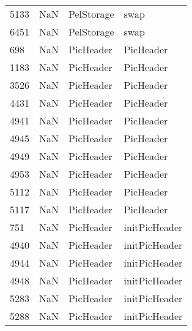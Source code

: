 \begin{tabular}{llll}
5133 &                   NaN &                 PelStorage &                                      swap \\
6451 &                   NaN &                 PelStorage &                                      swap \\
698  &                   NaN &                  PicHeader &                                 PicHeader \\
1183 &                   NaN &                  PicHeader &                                 PicHeader \\
3526 &                   NaN &                  PicHeader &                                 PicHeader \\
4431 &                   NaN &                  PicHeader &                                 PicHeader \\
4941 &                   NaN &                  PicHeader &                                 PicHeader \\
4945 &                   NaN &                  PicHeader &                                 PicHeader \\
4949 &                   NaN &                  PicHeader &                                 PicHeader \\
4953 &                   NaN &                  PicHeader &                                 PicHeader \\
5112 &                   NaN &                  PicHeader &                                 PicHeader \\
5117 &                   NaN &                  PicHeader &                                 PicHeader \\
751  &                   NaN &                  PicHeader &                             initPicHeader \\
4940 &                   NaN &                  PicHeader &                             initPicHeader \\
4944 &                   NaN &                  PicHeader &                             initPicHeader \\
4948 &                   NaN &                  PicHeader &                             initPicHeader \\
5283 &                   NaN &                  PicHeader &                             initPicHeader \\
5288 &                   NaN &                  PicHeader &                             initPicHeader \\

\end{tabular}

